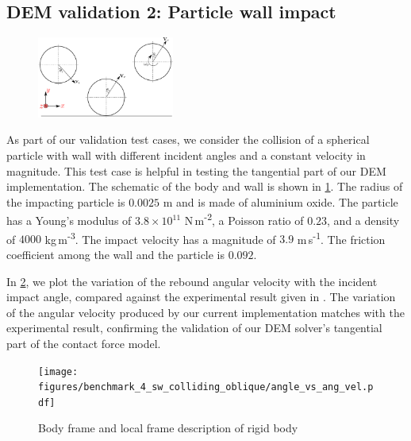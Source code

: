 \documentclass[preprint,12pt]{elsarticle}
\begin{document}
\FloatBarrier%
\subsection{DEM validation 2: Particle wall impact}
\label{sec:DEM_validation_2_particle_wall_impact}
\begin{figure}[!htpb]
  \centering
  \includegraphics[width=0.4\textwidth]{images/results_dem_2_validation_particle_wall_impact/schematic}
  \caption{}
  \label{fig:result:dem_sw_contact_schematic}
\end{figure}
As part of our validation test cases, we consider the collision of a spherical
particle with wall with different incident angles and a constant velocity in
magnitude. This test case is helpful in testing the tangential part of our DEM
implementation. The schematic of the body and wall is shown in
\cref{fig:result:dem_sw_contact_schematic}. The radius of the impacting particle is
$0.0025$ m and is made of aluminium oxide. The particle has a Young's modulus
of $3.8 \times 10^{11}$ N\,m\textsuperscript{-2}, a Poisson ratio of $0.23$, and a
density of $4000$ kg\,m\textsuperscript{-3}. The impact velocity has a
magnitude of $3.9$ m\,s\textsuperscript{-1}. The friction coefficient among
the wall and the particle is $0.092$.


In \cref{fig:result:dem_sw_contact_omega_vs_theta}, we plot the variation of
the rebound angular velocity with the incident impact angle, compared against
the experimental result given in \citet{xxxx}. The variation of the angular
velocity produced by our current implementation matches with the experimental
result, confirming the validation of our DEM solver's tangential part of the
contact force model.
\begin{figure}[!htpb]
  \centering
  \texttt{[image: figures/benchmark\_4\_sw\_colliding\_oblique/angle\_vs\_ang\_vel.pdf]}
  \caption{Body frame and local frame description of rigid body}
  \label{fig:result:dem_sw_contact_omega_vs_theta}
\end{figure}


\FloatBarrier%
\end{document}
